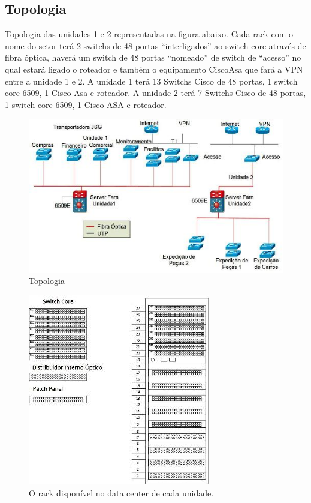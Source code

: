 \documentclass[	DIV=calc,%
							paper=a4,%
							fontsize=12pt,%
							onecolumn]{scrartcl}	 					%
\begin{document}
\subsection{Topologia}
Topologia das unidades 1 e 2 representadas na figura abaixo. Cada rack com o nome do setor terá 2 switchs de 48 portas “interligados” ao switch core através de fibra óptica, haverá um switch de 48 portas “nomeado” de switch de “acesso” no qual estará ligado o roteador e também o equipamento CiscoAsa que fará a VPN entre a unidade 1 e 2.
A unidade 1 terá 13 Switchs Cisco de 48 portas, 1 switch core 6509, 1 Cisco Asa e roteador.
A unidade 2 terá 7 Switchs Cisco de 48 portas, 1 switch core 6509, 1 Cisco ASA e roteador.

\begin{figure}
	\centering
	\includegraphics[]{fig9}
	\caption{Topologia }
	\label{fig9}
\end{figure} 
\begin{figure}
	\centering
	\includegraphics[]{fig10}
	\caption{O rack disponível no data center de cada unidade. }
	\label{fig10}
\end{figure} 
\end{document}
